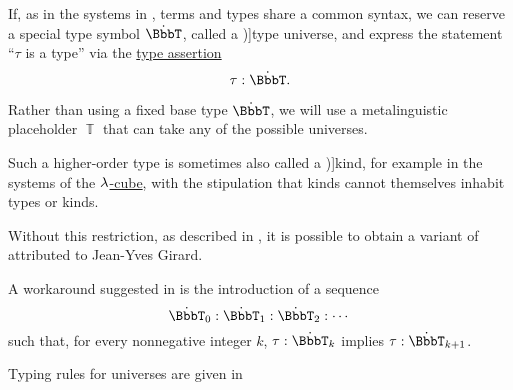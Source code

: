 \begin{concept}\label{con:type_universe}
  If, as in the systems in , terms and types share a common syntax, we can reserve a special type symbol \( \syn\BbbT \), called a \term[en=universe (\cite[\S 1.3]{UnivalentFoundationsProgram2024OctoberHoTT})]{type universe}, and express the statement \enquote{\( \tau \) is a type} via the \hyperref[def:type_assertion]{type assertion}
  \begin{equation*}
    \tau: \syn\BbbT.
  \end{equation*}

  Rather than using a fixed base type \( \syn\BbbT \), we will use a metalinguistic placeholder \( \BbbT \) that can take any of the possible universes.

  Such a higher-order type is sometimes also called a \term[en=kind (\cite[def. 5.2]{Barendregt1992LambdaCalculiWithTypes})]{kind}, for example in the systems of the \hyperref[def:lambda_cube]{\( {\mathrm \lambda} \)-cube}, with the stipulation that kinds cannot themselves inhabit types or kinds.

  Without this restriction, as described in , it is possible to obtain a variant of  attributed to Jean-Yves Girard.

  A workaround suggested in \cite[\S 1.3]{UnivalentFoundationsProgram2024OctoberHoTT} is the introduction of a sequence
  \begin{equation*}
    \syn\BbbT_0: \syn\BbbT_1: \syn\BbbT_2: \cdots
  \end{equation*}
  such that, for every nonnegative integer \( k \), \( \tau: \syn\BbbT_k \) implies \( \tau: \syn\BbbT_{k+1} \).
\end{concept}
\begin{comments}
  \item Typing rules for universes are given in 
\end{comments}

